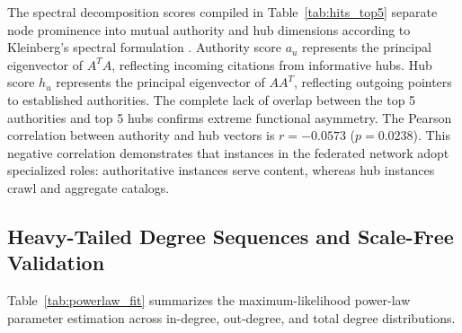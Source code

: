 \documentclass[conference]{IEEEtran}
\begin{document}
The spectral decomposition scores compiled in Table~\ref{tab:hits_top5} separate node prominence into mutual authority and hub dimensions according to Kleinberg's spectral formulation \cite{kleinberg1999authoritative}. Authority score $a_u$ represents the principal eigenvector of $A^T A$, reflecting incoming citations from informative hubs. Hub score $h_u$ represents the principal eigenvector of $A A^T$, reflecting outgoing pointers to established authorities. The complete lack of overlap between the top 5 authorities and top 5 hubs confirms extreme functional asymmetry. The Pearson correlation between authority and hub vectors is $r = -0.0573$ ($p = 0.0238$). This negative correlation demonstrates that instances in the federated network adopt specialized roles: authoritative instances serve content, whereas hub instances crawl and aggregate catalogs.

\subsection{Heavy-Tailed Degree Sequences and Scale-Free Validation}

Table~\ref{tab:powerlaw_fit} summarizes the maximum-likelihood power-law parameter estimation across in-degree, out-degree, and total degree distributions.

\begin{table}[htbp]
\caption{Clauset Maximum-Likelihood Power-Law Parameters and Statistical Comparison}
\label{tab:powerlaw_fit}
\centering
{}
\end{table}
\end{document}
